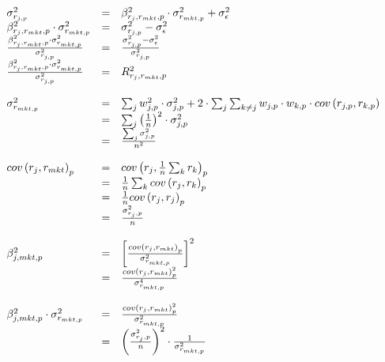 \documentclass[11pt, letterpaper, doublespacing]{article}
\begin{document}
\[
\begin{array}{l c l}
  \sigma_{r_{j, p}}^{2} & = & \beta_{r_{j}, r_{mkt}, p}^{2} \cdot \sigma_{r_{mkt, p}}^{2} + \sigma_{\epsilon}^{2} \\
  \beta_{r_{j}, r_{mkt}, p}^{2} \cdot \sigma_{r_{mkt, p}}^{2} & = & \sigma_{r_{j, p}}^{2} - \sigma_{\epsilon}^{2} \\
  \frac{\beta_{r_{j}, r_{mkt}, p}^{2} \cdot \sigma_{r_{mkt, p}}^{2}}{\sigma_{r_{j, p}}^{2}} & = & \frac{\sigma_{r_{j, p}}^{2} - \sigma_{\epsilon}^{2}}{\sigma_{r_{j, p}}^{2}} \\
    \frac{\beta_{r_{j}, r_{mkt}, p}^{2} \cdot \sigma_{r_{mkt, p}}^{2}}{\sigma_{r_{j, p}}^{2}}  & = & R_{r_{j}, r_{mkt}, p}^{2} \\ \\
  \sigma_{r_{mkt, p}}^{2} & = & \sum_{j} w_{j, p}^{2} \cdot \sigma_{j, p}^{2} + 2 \cdot \sum_{j} \sum_{k \neq j} w_{j, p} \cdot w_{k, p} \cdot cov \left ( r_{j, p}, r_{k, p} \right ) \\
                          & = & \sum_{j} \left ( \frac{1}{n} \right )^{2} \cdot \sigma_{j, p}^{2} \\
                          & = & \frac{\sum_{j} \sigma_{j, p}^{2}}{n^{2}} \\ \\
  cov \left ( r_{j}, r_{mkt} \right )_{p} & = & cov \left ( r_{j}, \frac{1}{n} \sum_{k} r_{k} \right )_{p} \\
                                          & = & \frac{1}{n} \sum_{k} cov \left ( r_{j}, r_{k} \right )_{p} \\
                                          & = & \frac{1}{n} cov \left ( r_{j}, r_{j} \right )_{p} \\
                                          & = & \frac{\sigma_{r_{j}, p}^{2}}{n} \\ \\
  \beta_{j, mkt, p}^{2} & = & \left [ \frac{cov \left ( r_{j}, r_{mkt} \right )_{p}}{\sigma_{r_{mkt, p}}^{2}} \right ]^{2} \\
                        & = & \frac{cov \left ( r_{j}, r_{mkt} \right )_{p}^{2}}{\sigma_{r_{mkt, p}}^{4}} \\ \\
  \beta_{j, mkt, p}^{2} \cdot  \sigma_{r_{mkt, p}}^{2}  & = & \frac{cov \left ( r_{j}, r_{mkt} \right )_{p}^{2}}{\sigma_{r_{mkt, p}}^{2}} \\
                                                        & = & \left ( \frac{\sigma_{r_{j}, p}^{2}}{n} \right )^{2} \cdot \frac{1}{\sigma_{r_{mkt, p}}^{2}} \\

\end{array}\]
\end{document}
